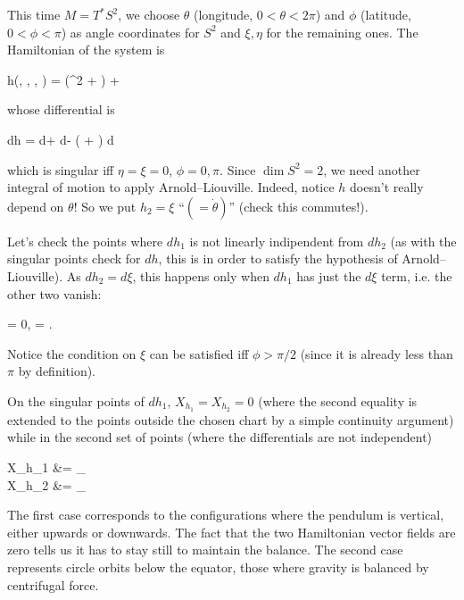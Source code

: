 \documentclass[main.tex]{subfiles}
\begin{document}
\begin{example}
	This time $M=T^*S^2$, we choose $\theta$ (longitude, $0 < \theta < 2\pi$) and $\phi$ (latitude, $0 < \phi < \pi$) as angle coordinates for $S^2$ and $\xi, \eta$ for the remaining ones. The Hamiltonian of the system is
	\begin{eqalign}
		h(\theta, \phi, \xi, \eta) =  \left(\eta^2 + \right) + \cos \phi
	\end{eqalign}
	whose differential is
	\begin{eqalign}
		dh = \eta d\eta + \frac{\xi}{\sin^2 \phi}d\xi - \left(\frac{\xi^2 \cos\phi}{\sin^3 \phi} + \sin\phi\right) d\phi
	\end{eqalign}
	which is singular iff $\eta=\xi=0$, $\phi=0,\pi$. Since $\dim S^2 = 2$, we need another integral of motion to apply Arnold--Liouville. Indeed, notice $h$ doesn't really depend on $\theta$! So we put $h_2=\xi$ ``$(=\dot \theta)$'' (check this commutes!).

	Let's check the points where $dh_1$ is not linearly indipendent from $dh_2$ (as with the singular points check for $dh$, this is in order to satisfy the hypothesis of Arnold--Liouville). As $dh_2 = d\xi$, this happens only when $dh_1$ has just the $d\xi$ term, i.e. the other two vanish:
	\begin{eqalign}
		\eta = 0, \quad \xi = \pm \sqrt{-\frac{\sin^4 \phi}{\cos \phi}}.
	\end{eqalign}
	Notice the condition on $\xi$ can be satisfied iff $\phi > \pi/2$ (since it is already less than $\pi$ by definition).

	On the singular points of $dh_1$, $X_{h_1} = X_{h_2} = 0$ (where the second equality is extended to the points outside the chosen chart by a simple continuity argument) while in the second set of points (where the differentials are not independent)
	\begin{eqalign}
		X_{h_1} &= \pm {} \partial_\theta\\
		X_{h_2} &= \partial_\theta
	\end{eqalign}
	The first case corresponds to the configurations where the pendulum is vertical, either upwards or downwards. The fact that the two Hamiltonian vector fields are zero tells us it has to stay still to maintain the balance. The second case represents circle orbits below the equator, those where gravity is balanced by centrifugal force.
\end{example}
\end{document}
